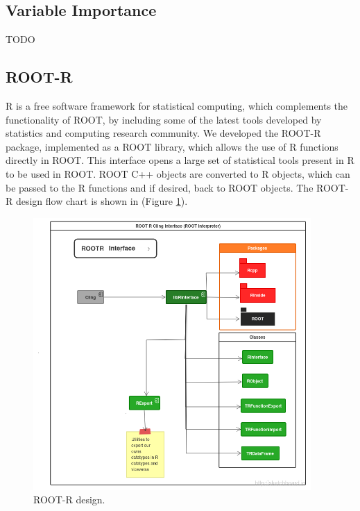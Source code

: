 \documentclass[a4paper]{jpconf}
\begin{document}
\subsection{Variable Importance}
TODO

\clearpage
\subsection{ROOT-R}
R  is a free software framework for statistical computing\cite{R}, which complements the functionality of ROOT, by including some of the latest tools developed by statistics and computing research community. 
We developed the ROOT-R package, implemented as a ROOT library, which allows the  use of R functions directly in ROOT.
This interface opens a large set of statistical tools present in R to be used in ROOT. ROOT C++ objects are converted to R objects, which can be passed to the  R functions and if desired, back to ROOT objects. 
The ROOT-R design flow chart is shown in (Figure \ref{rootr:label}). 

\begin{figure}[h]
\centering
\includegraphics[width=25pc]{img/rootr.png}\caption{\label{rootr:label} ROOT-R design.}
\end{figure}
\end{document}
